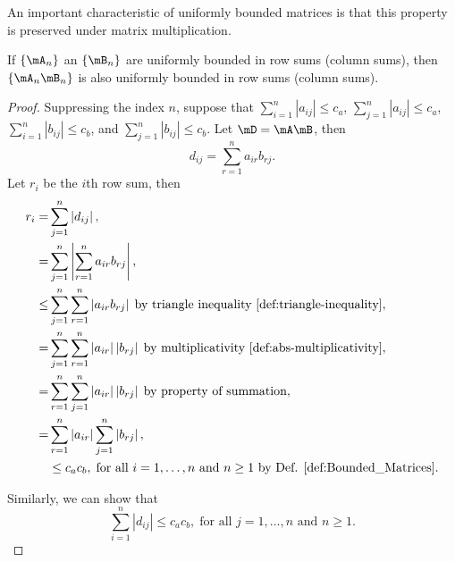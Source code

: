 \documentclass[english,12pt]{book}\usepackage[]{graphicx}\usepackage[]{xcolor}
\begin{document}
An important characteristic of uniformly bounded matrices is that this property is preserved under matrix multiplication. 

\begin{lemma}\label{lemma:bounded_lemma}
If $\left\lbrace \mA_n \right\rbrace$ an $\left\lbrace \mB_n \right\rbrace$ are uniformly bounded in row sums (column sums), then $\left\lbrace \mA_n \mB_n\right\rbrace$ is also uniformly bounded in row sums (column sums).
\end{lemma}

\begin{proof}
 Suppressing the index $n$, suppose that $\sum_{i = 1}^n|a_{ij}|\leq c_a$, $\sum_{j = 1}^n|a_{ij}|\leq c_a$, $\sum_{i = 1}^n|b_{ij}|\leq c_b$, and $\sum_{j = 1}^n|b_{ij}|\leq c_b$. Let $\mD = \mA\mB$, then
 \begin{equation*}
  d_{ij} = \sum_{r = 1}^n a_{ir}b_{rj}.
 \end{equation*}
 Let $r_i$ be the $i$th row sum, then
 \begin{equation*}
 \begin{aligned}
  r_i   = & \sum_{j = 1}^n \left|d_{ij}\right|, \\
        = & \sum_{j = 1}^n \left|\sum_{r = 1}^n a_{ir}b_{rj}\right|, \\
     \leq & \sum_{j = 1}^n \sum_{r = 1}^n \left|a_{ir}b_{rj}\right|\;\mbox{by triangle inequality \ref{def:triangle-inequality}}, \\
      = & \sum_{j = 1}^n \sum_{r = 1}^n \left|a_{ir}\right|\left|b_{rj}\right|\;\mbox{by multiplicativity \ref{def:abs-multiplicativity}}, \\
      = & \sum_{r = 1}^n \sum_{j = 1}^n \left|a_{ir}\right|\left|b_{rj}\right|\;\mbox{by property of summation}, \\
      = & \sum_{r = 1}^n \left|a_{ir}\right| \sum_{j = 1}^n \left|b_{rj}\right| ,\\
        & \leq c_{a} c_{b},\; \mbox{for all $i = 1,\ldots, n$ and $n\geq 1$ by Def. \ref{def:Bounded_Matrices}}.
 \end{aligned}
 \end{equation*}
 
 Similarly, we can show that 
 \begin{equation*}
 \sum_{i = 1}^n \left|d_{ij}\right|\leq c_{a} c_{b},\; \mbox{for all $j = 1,\ldots, n$ and $n\geq 1$.}
 \end{equation*}
\end{proof}
\end{document}
